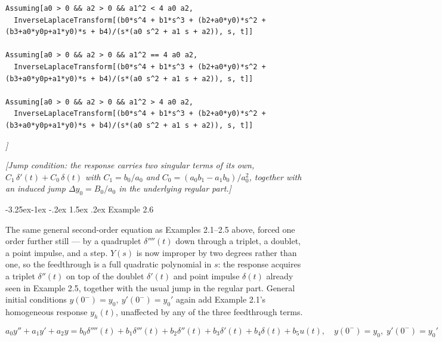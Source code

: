 \documentclass[
  11pt,
]{article}
\makeatletter
\renewcommand\paragraph{\@startsection{paragraph}{4}{\z@}%
                                     {-3.25ex\@plus -1ex \@minus -.2ex}%
                                     {1.5ex \@plus .2ex}%
                                     {\normalfont\normalsize\bfseries}}
\makeatother
\begin{document}
\begin{verbatim}
Assuming[a0 > 0 && a2 > 0 && a1^2 < 4 a0 a2,
  InverseLaplaceTransform[(b0*s^4 + b1*s^3 + (b2+a0*y0)*s^2 + (b3+a0*y0p+a1*y0)*s + b4)/(s*(a0 s^2 + a1 s + a2)), s, t]]

Assuming[a0 > 0 && a2 > 0 && a1^2 == 4 a0 a2,
  InverseLaplaceTransform[(b0*s^4 + b1*s^3 + (b2+a0*y0)*s^2 + (b3+a0*y0p+a1*y0)*s + b4)/(s*(a0 s^2 + a1 s + a2)), s, t]]

Assuming[a0 > 0 && a2 > 0 && a1^2 > 4 a0 a2,
  InverseLaplaceTransform[(b0*s^4 + b1*s^3 + (b2+a0*y0)*s^2 + (b3+a0*y0p+a1*y0)*s + b4)/(s*(a0 s^2 + a1 s + a2)), s, t]]
\end{verbatim}

\emph{{]}}

\emph{{[}Jump condition: the response carries two singular terms of its
own, \(C_1\,\delta'(t) + C_0\,\delta(t)\) with \(C_1 = b_0/a_0\) and
\(C_0 = (a_0 b_1 - a_1 b_0)/a_0^2\), together with an induced jump
\(\Delta y_0 = B_0/a_0\) in the underlying regular part.{]}}

\hypertarget{example-2.6}{%
\paragraph{Example 2.6}\label{example-2.6}}

The same general second-order equation as Examples 2.1--2.5 above,
forced one order further still --- by a quadruplet \(\delta''''(t)\)
down through a triplet, a doublet, a point impulse, and a step. \(Y(s)\)
is now improper by two degrees rather than one, so the feedthrough is a
full quadratic polynomial in \(s\): the response acquires a triplet
\(\delta''(t)\) on top of the doublet \(\delta'(t)\) and point impulse
\(\delta(t)\) already seen in Example 2.5, together with the usual jump
in the regular part. General initial conditions
\(y(0^-)=y_0,\ y'(0^-)=y_0'\) again add Example 2.1's homogeneous
response \(y_h(t)\), unaffected by any of the three feedthrough terms.

\[
a_0 y'' + a_1 y' + a_2 y = b_0 \delta''''(t) + b_1 \delta'''(t) + b_2 \delta''(t) + b_3 \delta'(t) + b_4 \delta(t) + b_5 u(t), \quad y(0^-) = y_0, \; y'(0^-) = y_0'
\]
\end{document}
